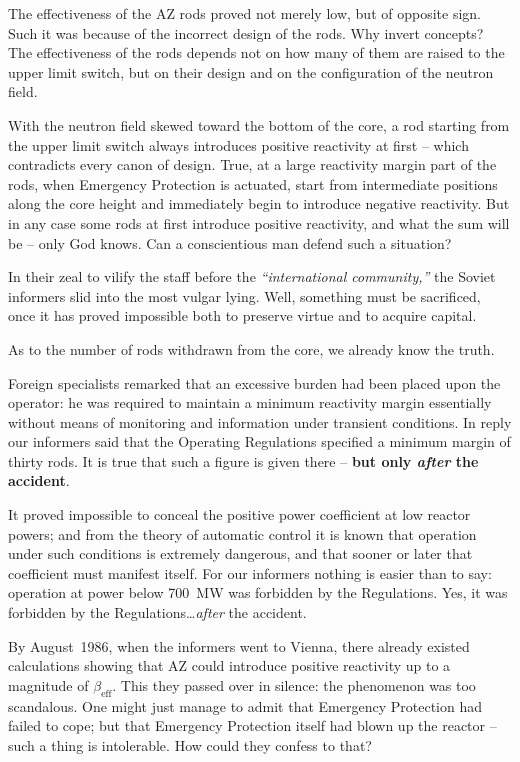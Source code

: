 \documentclass[openright]{bookest}
\begin{document}
The effectiveness of the AZ rods proved not merely low, but of opposite sign. Such it was because of the incorrect design of the rods. Why invert concepts? The effectiveness of the rods depends not on how many of them are raised to the upper limit switch, but on their design and on the configuration of the neutron field.

With the neutron field skewed toward the bottom of the core, a rod starting from the upper limit switch always introduces positive reactivity at first -- which contradicts every canon of design. True, at a large reactivity margin part of the rods, when Emergency Protection is actuated, start from intermediate positions along the core height and immediately begin to introduce negative reactivity. But in any case some rods at first introduce positive reactivity, and what the sum will be -- only God knows. Can a conscientious man defend such a situation?

In their zeal to vilify the staff before the \textit{``international community,''} the Soviet informers slid into the most vulgar lying. Well, something must be sacrificed, once it has proved impossible both to preserve virtue and to acquire capital.

As to the number of rods withdrawn from the core, we already know the truth.

Foreign specialists remarked that an excessive burden had been placed upon the operator: he was required to maintain a minimum reactivity margin essentially without means of monitoring and information under transient conditions. In reply our informers said that the Operating Regulations specified a minimum margin of thirty rods. It is true that such a figure is given there -- \textbf{but only \textit{after} the accident}.

It proved impossible to conceal the positive power coefficient at low reactor powers; and from the theory of automatic control it is known that operation under such conditions is extremely dangerous, and that sooner or later that coefficient must manifest itself. For our informers nothing is easier than to say: operation at power below \qty{700}{\mega\watt} was forbidden by the Regulations. Yes, it was forbidden by the Regulations\ldots \textit{after} the accident.

By August~1986, when the informers went to Vienna, there already existed calculations showing that AZ could introduce positive reactivity up to a magnitude of $\beta_{\mathrm{eff}}$. This they passed over in silence: the phenomenon was too scandalous. One might just manage to admit that Emergency Protection had failed to cope; but that Emergency Protection itself had blown up the reactor -- such a thing is intolerable. How could they confess to that?
\end{document}
